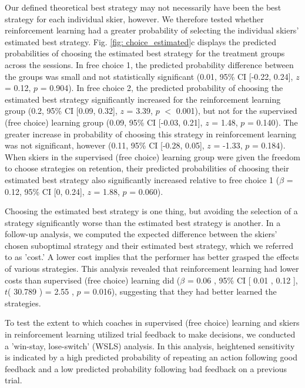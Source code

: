 \documentclass[pdflatex,sn-mathphys-num]{sn-jnl}%
\theoremstyle{thmstyleone}%
\theoremstyle{thmstyletwo}%
\theoremstyle{thmstylethree}%
\begin{document}
Our defined theoretical best strategy may not necessarily have been the best strategy for each individual skier, however. We therefore tested whether reinforcement learning had a greater probability of selecting the individual skiers' estimated best strategy.  Fig. \ref{fig: choice_estimated}c displays the predicted probabilities of choosing the estimated best strategy for the treatment groups across the sessions. In free choice 1, the predicted probability difference between the groups was small and not statistically significant (0.01, 95\% CI [-0.22, 0.24], $z$ = 0.12, $p$ = 0.904). In free choice 2, the predicted probability of choosing the estimated best strategy significantly increased for the reinforcement learning group (0.2, 95\% CI [0.09, 0.32], $z$ = 3.39, $p$  $<$ 0.001), but not for the supervised (free choice) learning group (0.09, 95\% CI [-0.03, 0.21], $z$ = 1.48, $p$ = 0.140). The greater increase in probability of choosing this strategy in reinforcement learning was not significant, however (0.11, 95\% CI [-0.28, 0.05], $z$ = -1.33, $p$ = 0.184). When skiers in the supervised (free choice) learning group were given the freedom to choose strategies on retention, their predicted probabilities of choosing their estimated best strategy also significantly increased relative to free choice 1 ($\beta$ = 0.12, 95\% CI [0, 0.24], $z$ = 1.88, $p$ = 0.060). 

Choosing the estimated best strategy is one thing, but avoiding the selection of a strategy significantly worse than the estimated best strategy is another. In a follow-up analysis, we computed the expected difference between the skiers' chosen suboptimal strategy and their estimated best strategy, which we referred to as 'cost.' A lower cost implies that the performer has better grasped the effects of various strategies. This analysis revealed that reinforcement learning had lower costs than supervised (free choice) learning did  ($\beta$ = 0.06 , 95\% CI [ 0.01 ,  0.12 ], $t$( 30.789 ) = 2.55 , $p$  =  0.016), suggesting that they had better learned the strategies.

To test the extent to which coaches in supervised (free choice) learning and skiers in reinforcement learning utilized trial feedback to make decisions, we conducted a 'win-stay, lose-switch' (WSLS) analysis. In this analysis, heightened sensitivity is indicated by a high predicted probability of repeating an action following good feedback and a low predicted probability following bad feedback on a previous trial.
\end{document}
